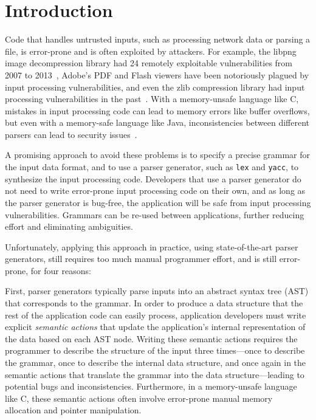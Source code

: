 \section{Introduction}

Code that handles untrusted inputs, such as processing network
data or parsing a file, is error-prone and is often exploited by
attackers.
For example, the libpng image decompression library had 24 remotely
exploitable vulnerabilities from 2007 to 2013~\cite{cvedetails:libpng},
Adobe's PDF and Flash viewers have been notoriously plagued by input
processing vulnerabilities, and even the zlib compression library had
input processing vulnerabilities in the past~\cite{cvedetails:zlib}.
With a memory-unsafe language like C, mistakes in input processing
code can lead to memory errors like buffer overflows, but even with
a memory-safe language like Java, inconsistencies between different
parsers can lead to security issues~\cite{saurik-masterkey}.

A promising approach to avoid these problems is to specify
a precise grammar for the input data format, and to use a parser
generator, such as {\tt lex} and {\tt yacc}, to synthesize the input
processing code.  Developers that use a parser generator do not need
to write error-prone input processing code on their own, and as long
as the parser generator is bug-free, the application will be safe from
input processing vulnerabilities. Grammars can be re-used between
applications, further reducing effort and eliminating ambiguities.

Unfortunately, applying this approach in practice, using state-of-the-art
parser generators, still requires too much manual programmer effort,
and is still error-prone, for four reasons:

First, parser generators typically parse inputs into an abstract syntax
tree (AST) that corresponds to the grammar.  In order to produce a data
structure that the rest of the application code can easily process,
application developers must write explicit {\em semantic actions} that
update the application's internal representation of the data based on
each AST node.  
Writing these semantic actions requires the programmer to describe the
structure of the input three
times---once to describe the grammar, once to describe the internal data
structure, and once again in the semantic actions that translate the
grammar into the data structure---leading to potential bugs and
inconsistencies.
Furthermore, in a memory-unsafe language like C, these semantic
actions often involve error-prone manual memory allocation and
pointer manipulation.

